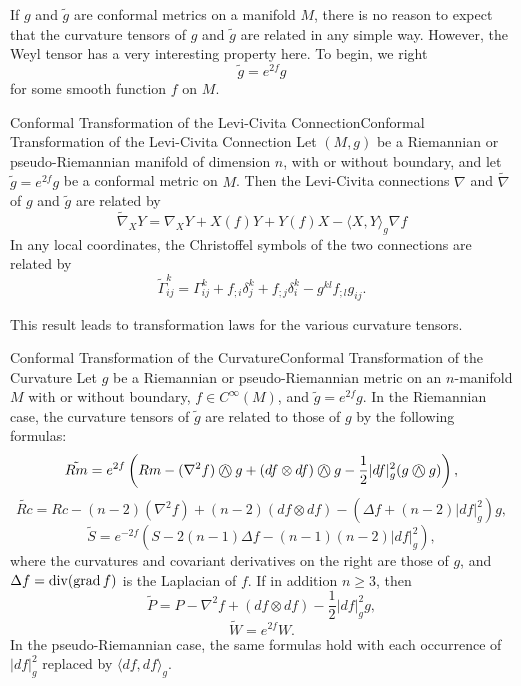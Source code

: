 \documentclass[../main.tex]{subfiles}
\begin{document}
If $g$ and $\tilde{g}$ are conformal metrics on a manifold $M$, there is no reason to expect that the curvature tensors of $g$ and $\tilde{g}$ are related in any simple way. However, the Weyl tensor has a very interesting property here. To begin, we right
\begin{equation}
	\tilde{g} = e^{2f} g
\end{equation}
for some smooth function $f$ on $M$.

\begin{proposition}{Conformal Transformation of the Levi-Civita Connection}{Conformal Transformation of the Levi-Civita Connection}
	Let $(M, g)$ be a Riemannian or pseudo-Riemannian manifold of dimension $n$, with or without boundary, and let $\tilde{g} = e^{2f} g$ be a conformal metric on $M$. Then the Levi-Civita connections $\nabla$ and $\tilde{\nabla}$ of $g$ and $\tilde{g}$ are related by
	\begin{equation}
		\tilde{\nabla}_X Y = \nabla_X Y + X(f) Y + Y(f) X - \langle X, Y \rangle_g \nabla f
	\end{equation}
	In any local coordinates, the Christoffel symbols of the two connections are related by
	\begin{equation}
		\tilde{\Gamma}_{ij}^k = \Gamma_{ij}^k + f_{;i} \delta_j^k + f_{;j} \delta_i^k - g^{kl} f_{;l} g_{ij}.
	\end{equation}
\end{proposition}

This result leads to transformation laws for the various curvature tensors.

\begin{theorem}{Conformal Transformation of the Curvature}{Conformal Transformation of the Curvature}
	Let $g$ be a Riemannian or pseudo-Riemannian metric on an $n$-manifold $M$ with or without boundary, $f\in C^\infty(M)$, and $\tilde g=e^{2f}g$. In the Riemannian case, the curvature tensors of $\tilde g$ are related to those of $g$ by the following formulas:
	\begin{equation}
		\tilde{Rm}=e^{2f}\left(Rm-(\nabla^2f)\owedge g+(df\otimes df)\owedge g-\frac{1}{2}|df|_g^2(g\owedge g)\right),
	\end{equation}
	\begin{equation}
		\tilde{Rc}=Rc-(n-2)(\nabla^2f)+(n-2)(df\otimes df)-\left(\Delta f+(n-2)|df|_g^2\right)g,
	\end{equation}
	\begin{equation}
		\tilde S=e^{-2f}\left(S-2(n-1)\Delta f-(n-1)(n-2)|df|_g^2\right),
	\end{equation}
	where the curvatures and covariant derivatives on the right are those of $g$, and $\Delta f= \operatorname{div}(\operatorname{grad} f)$ is the Laplacian of $f$. If in addition $n\geq 3$, then
	\begin{equation}
		\tilde P=P-\nabla^2f+(df\otimes df)-\frac{1}{2}|df|_g^2g,
	\end{equation}
	\begin{equation}
		\tilde W=e^{2f}W.
	\end{equation}
	In the pseudo-Riemannian case, the same formulas hold with each occurrence of $|df|_g^2$ replaced by $\langle df,df\rangle_g$.
\end{theorem}
\end{document}
